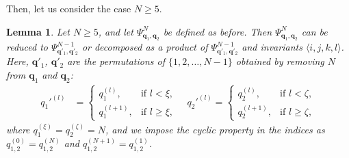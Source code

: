 \documentclass[
amsmath,amssymb,
]{revtex4-2}
\newtheorem{lemma}{Lemma}
\begin{document}
Then, let us consider the case $N\geq 5$. 
%
\begin{lemma}
\label{lem:decomposition}
    Let $N \geq 5$, and let $\Psi^N_{\bm{q}_1, \bm{q}_2}$ be defined as before. Then $\Psi^N_{\bm{q}_1, \bm{q}_2}$ can be reduced to $\Psi^{N-1}_{\bm{q}'_1, \bm{q}'_2}$ or decomposed as a product of $\Psi^{N-1}_{\bm{q}'_1, \bm{q}'_2}$ and invariants $\langle  i,j,k,l\rangle$.
    Here,    
    $\bm{q}'_1$, $\bm{q}'_2$ are the permutations of $\{1,2,\ldots,N-1\}$ obtained by removing $N$ 
    from $\bm{q}_1$ and $\bm{q}_2$:
    \begin{align}
        q_1'^{(l)} &=
        \begin{cases}
            q_1^{(l)}, & \text{if } l < \xi, \\
            q_1^{(l+1)}, & \text{if } l \geq \xi,
        \end{cases} \quad
        q_2'^{(l)} =
        \begin{cases}
            q_2^{(l)}, & \text{if } l < \zeta, \\
            q_2^{(l+1)}, & \text{if } l \geq \zeta,
        \end{cases}
    \end{align}
    where $q_1^{(\xi)} = q_2^{(\zeta)} = N$, and we impose the cyclic property in the indices as $q_{1,2}^{(0)}=q_{1,2}^{(N)}$ and $q_{1,2}^{(N+1)}=q_{1,2}^{(1)}$.
\end{lemma}
\end{document}
